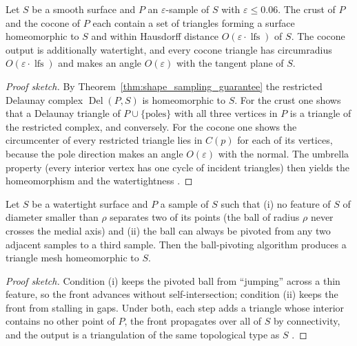 \begin{theorem}\label{thm:shape_crust_guarantee}
  Let $S$ be a smooth surface and $P$ an $\varepsilon$-sample of $S$ with
  $\varepsilon \le 0.06$. The crust of $P$ \cite{amentabern1999} and the cocone
  of $P$ \cite{amenta2000} each contain a set of triangles forming a surface
  homeomorphic to $S$ and within Hausdorff distance $O(\varepsilon \cdot
  \operatorname{lfs})$ of $S$. The cocone output is additionally watertight,
  and every cocone triangle has circumradius $O(\varepsilon \cdot
  \operatorname{lfs})$ and makes an angle $O(\varepsilon)$ with the tangent
  plane of $S$.
\end{theorem}

\begin{proof}[Proof sketch]
  By Theorem~\ref{thm:shape_sampling_guarantee} the restricted Delaunay complex
  $\operatorname{Del}(P, S)$ is homeomorphic to $S$. For the crust one shows
  that a Delaunay triangle of $P \cup \{ \text{poles} \}$ with all three
  vertices in $P$ is a triangle of the restricted complex, and conversely. For
  the cocone one shows the circumcenter of every restricted triangle lies in
  $C(p)$ for each of its vertices, because the pole direction makes an angle
  $O(\varepsilon)$ with the normal. The umbrella property (every interior
  vertex has one cycle of incident triangles) then yields the homeomorphism and
  the watertightness \cite{amenta2000,dey2007}.
\end{proof}

\begin{theorem}\label{thm:shape_ball_pivoting_correctness}
  Let $S$ be a watertight surface and $P$ a sample of $S$ such that (i) no
  feature of $S$ of diameter smaller than $\rho$ separates two of its points
  (the ball of radius $\rho$ never crosses the medial axis) and (ii) the ball
  can always be pivoted from any two adjacent samples to a third sample. Then
  the ball-pivoting algorithm \cite{bernardini1999} produces a triangle mesh
  homeomorphic to $S$.
\end{theorem}

\begin{proof}[Proof sketch]
  Condition (i) keeps the pivoted ball from ``jumping'' across a thin feature,
  so the front advances without self-intersection; condition (ii) keeps the
  front from stalling in gaps. Under both, each step adds a triangle whose
  interior contains no other point of $P$, the front propagates over all of $S$
  by connectivity, and the output is a triangulation of the same topological
  type as $S$ \cite{bernardini1999}.
\end{proof}

